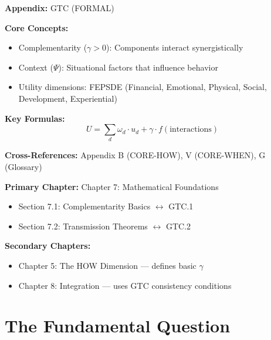 \begin{tcolorbox}[colback=blue!5!white, colframe=blue!75!black,
    title=Quick Reference: General Theory of Complementarity (GTC)]

\textbf{Appendix:} GTC (FORMAL)

\textbf{Core Concepts:}
\begin{itemize}[nosep]
\item Complementarity ($\gamma > 0$): Components interact synergistically
\item Context ($\Psi$): Situational factors that influence behavior
\item Utility dimensions: FEPSDE (Financial, Emotional, Physical, Social, Development, Experiential)
\end{itemize}

\textbf{Key Formulas:}
\begin{equation}
U = \sum_d \omega_d \cdot u_d + \gamma \cdot f(\text{interactions})
\end{equation}

\textbf{Cross-References:} Appendix B (CORE-HOW), V (CORE-WHEN), G (Glossary)
\end{tcolorbox}

\begin{tcolorbox}[colback=purple!5!white, colframe=purple!75!black,
    title=Chapter Linkage]

\textbf{Primary Chapter:} Chapter 7: Mathematical Foundations
\begin{itemize}[nosep]
\item Section 7.1: Complementarity Basics $\leftrightarrow$ GTC.1
\item Section 7.2: Transmission Theorems $\leftrightarrow$ GTC.2
\end{itemize}

\textbf{Secondary Chapters:}
\begin{itemize}[nosep]
\item Chapter 5: The HOW Dimension --- defines basic $\gamma$
\item Chapter 8: Integration --- uses GTC consistency conditions
\end{itemize}

\end{tcolorbox}

\section{The Fundamental Question}
\label{sec:gtc-fundamental}

